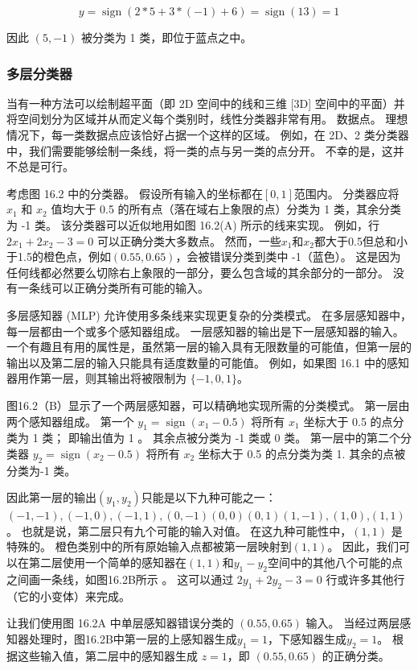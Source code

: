 $$
y=\operatorname{sign}(2 * 5+3 *(-1)+6)=\operatorname{sign}(13)=1
$$

因此 $(5,-1)$ 被分类为 1 类，即位于蓝点之中。

\subsubsection{多层分类器}
当有一种方法可以绘制超平面（即 $2 \mathrm{D}$ 空间中的线和三维 [3D] 空间中的平面）并将空间划分为区域并从而定义每个类别时，线性分类器非常有用。 数据点。 理想情况下，每一类数据点应该恰好占据一个这样的区域。 例如，在 2D、2 类分类器中，我们需要能够绘制一条线，将一类的点与另一类的点分开。 不幸的是，这并不总是可行。

考虑图 16.2 中的分类器。 假设所有输入的坐标都在$[0,1]$范围内。 分类器应将 $x_{1}$ 和 $x_{2}$ 值均大于 0.5 的所有点（落在域右上象限的点）分类为 1 类，其余分类为 -1 类。 该分类器可以近似地用如图 16.2(A) 所示的线来实现。 例如，行 $2 x_{1}+2 x_{2}-3=0$ 可以正确分类大多数点。 然而，一些$x_{1}$和$x_{2}$都大于0.5但总和小于1.5的橙色点，例如$(0.55,0.65)$，会被错误分类到类中 -1（蓝色）。 这是因为任何线都必然要么切除右上象限的一部分，要么包含域的其余部分的一部分。 没有一条线可以正确分类所有可能的输入。

多层感知器 (MLP) 允许使用多条线来实现更复杂的分类模式。 在多层感知器中，每一层都由一个或多个感知器组成。 一层感知器的输出是下一层感知器的输入。 一个有趣且有用的属性是，虽然第一层的输入具有无限数量的可能值，但第一层的输出以及第二层的输入只能具有适度数量的可能值。 例如，如果图 16.1 中的感知器用作第一层，则其输出将被限制为 $\{-1,0,1\}$。

图16.2（B）显示了一个两层感知器，可以精确地实现所需的分类模式。 第一层由两个感知器组成。 第一个 $y_{1}=\operatorname{sign}\left(x_{1}-0.5\right)$ 将所有 $x_{1}$ 坐标大于 0.5 的点分类为 1 类； 即输出值为 1 。 其余点被分类为 -1 类或 0 类。 第一层中的第二个分类器 $y_{2}=\operatorname{sign}\left(x_{2}-0.5\right)$ 将所有 $x_{2}$ 坐标大于 0.5 的点分类为类 1. 其余的点被分类为-1 类。

因此第一层的输出$\left(y_{1}, y_{2}\right)$只能是以下九种可能之一：$(-1,-1),(-1,0), (-1,1),(0,-1)(0,0)(0,1)(1,-1),(1,0)$,$(1,1)$。 也就是说，第二层只有九个可能的输入对值。 在这九种可能性中，$(1,1)$ 是特殊的。 橙色类别中的所有原始输入点都被第一层映射到$(1,1)$。 因此，我们可以在第二层使用一个简单的感知器在$(1,1)$和$y_{1}-y_{2}$空间中的其他八个可能的点之间画一条线，如图16.2B所示 。 这可以通过 $2 y_{1}+2 y_{2}-3=0$ 行或许多其他行（它的小变体）来完成。

让我们使用图 16.2A 中单层感知器错误分类的 $(0.55,0.65)$ 输入。 当经过两层感知器处理时，图16.2B中第一层的上感知器生成$y_{1}=1$，下感知器生成$y_{2}=1$。 根据这些输入值，第二层中的感知器生成 $z=1$，即 $(0.55,0.65)$ 的正确分类。

